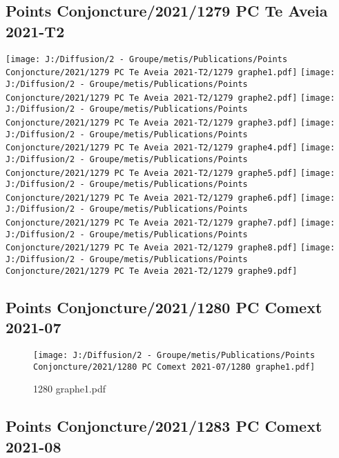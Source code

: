 \documentclass[
]{article}
\begin{document}
\hypertarget{points-conjoncture20211279-pc-te-aveia-2021-t2}{%
\subsection{Points Conjoncture/2021/1279 PC Te Aveia
2021-T2}\label{points-conjoncture20211279-pc-te-aveia-2021-t2}}

\texttt{[image: J:/Diffusion/2 - Groupe/metis/Publications/Points Conjoncture/2021/1279 PC Te Aveia 2021-T2/1279 graphe1.pdf]}
\texttt{[image: J:/Diffusion/2 - Groupe/metis/Publications/Points Conjoncture/2021/1279 PC Te Aveia 2021-T2/1279 graphe2.pdf]}
\texttt{[image: J:/Diffusion/2 - Groupe/metis/Publications/Points Conjoncture/2021/1279 PC Te Aveia 2021-T2/1279 graphe3.pdf]}
\texttt{[image: J:/Diffusion/2 - Groupe/metis/Publications/Points Conjoncture/2021/1279 PC Te Aveia 2021-T2/1279 graphe4.pdf]}
\texttt{[image: J:/Diffusion/2 - Groupe/metis/Publications/Points Conjoncture/2021/1279 PC Te Aveia 2021-T2/1279 graphe5.pdf]}
\texttt{[image: J:/Diffusion/2 - Groupe/metis/Publications/Points Conjoncture/2021/1279 PC Te Aveia 2021-T2/1279 graphe6.pdf]}
\texttt{[image: J:/Diffusion/2 - Groupe/metis/Publications/Points Conjoncture/2021/1279 PC Te Aveia 2021-T2/1279 graphe7.pdf]}
\texttt{[image: J:/Diffusion/2 - Groupe/metis/Publications/Points Conjoncture/2021/1279 PC Te Aveia 2021-T2/1279 graphe8.pdf]}
\texttt{[image: J:/Diffusion/2 - Groupe/metis/Publications/Points Conjoncture/2021/1279 PC Te Aveia 2021-T2/1279 graphe9.pdf]}

\hypertarget{points-conjoncture20211280-pc-comext-2021-07}{%
\subsection{Points Conjoncture/2021/1280 PC Comext
2021-07}\label{points-conjoncture20211280-pc-comext-2021-07}}

\begin{figure}
\centering
\texttt{[image: J:/Diffusion/2 - Groupe/metis/Publications/Points Conjoncture/2021/1280 PC Comext 2021-07/1280 graphe1.pdf]}
\caption{1280 graphe1.pdf}
\end{figure}

\hypertarget{points-conjoncture20211283-pc-comext-2021-08}{%
\subsection{Points Conjoncture/2021/1283 PC Comext
2021-08}\label{points-conjoncture20211283-pc-comext-2021-08}}
\end{document}
